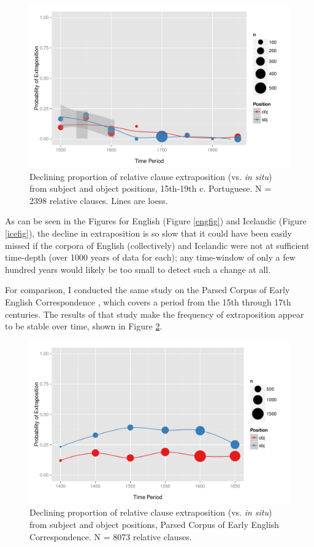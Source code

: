 \begin{figure}
  \includegraphics[width=1.1\textwidth]{stableVarTalks/exSbjObjYearBinned50Loessport.pdf}
\caption{Declining proportion of relative clause extraposition (vs. \textsl{in situ}) from subject and object positions, 15th-19th c. Portuguese. N = 2398 relative clauses. Lines are loess.}
\label{portfig}       
\end{figure}



As can be seen in the Figures for English (Figure \ref{engfig}) and Icelandic (Figure \ref{icefig}), the decline in extraposition is so slow that it could have been easily missed if the corpora of English (collectively) and Icelandic were not at sufficient time-depth (over 1000 years of data for each); any time-window of only a few hundred years would likely be too small to detect such a change at all.

For comparison, I conducted the same study on the Parsed Corpus of Early English Correspondence \citep[PCEEC][]{pceec}, which covers a period from the 15th through 17th centuries. The results of that study make the frequency of extraposition appear to be stable over time, shown in Figure \ref{pceecfig}.

\begin{figure}
  \includegraphics[width=1.1\textwidth]{stableVarTalks/exSbjObjYearBinned50.pdf}
\caption{Declining proportion of relative clause extraposition (vs. \textsl{in situ}) from subject and object positions, Parsed Corpus of Early English Correspondence. N = 8073 relative clauses. }
\label{pceecfig}       
\end{figure}

